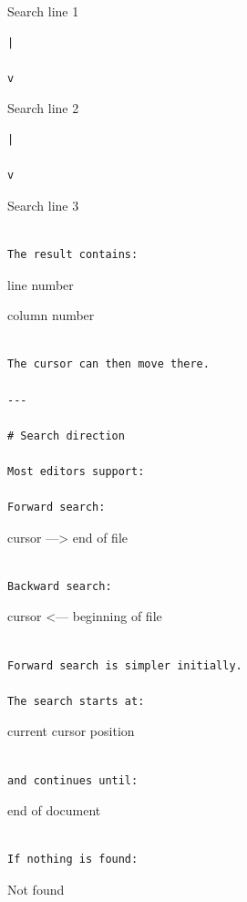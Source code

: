 \documentclass[
  oneside,
  openany]{book}
\begin{document}
Search line 1

\begin{verbatim}
|

v
\end{verbatim}

Search line 2

\begin{verbatim}
|

v
\end{verbatim}

Search line 3

\begin{verbatim}

The result contains:
\end{verbatim}

line number

column number

\begin{verbatim}

The cursor can then move there.

---

# Search direction

Most editors support:

Forward search:
\end{verbatim}

cursor ---\textgreater{} end of file

\begin{verbatim}

Backward search:
\end{verbatim}

cursor \textless--- beginning of file

\begin{verbatim}

Forward search is simpler initially.

The search starts at:
\end{verbatim}

current cursor position

\begin{verbatim}

and continues until:
\end{verbatim}

end of document

\begin{verbatim}

If nothing is found:
\end{verbatim}

Not found
\end{document}

